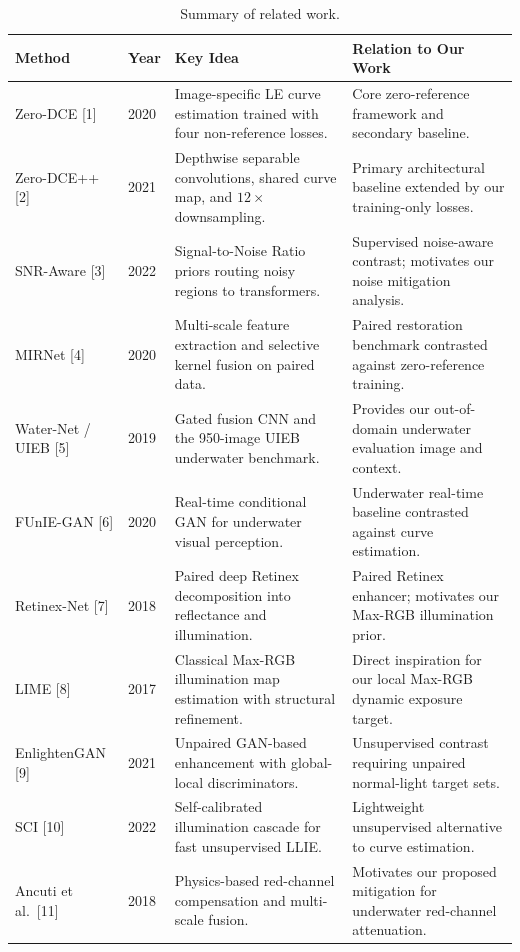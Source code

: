 \documentclass[11pt, letterpaper]{article}
\begin{document}
\begin{table}[h]
\centering
\small
\begin{tabular}{p{2.4cm}p{0.9cm}p{4.6cm}p{5.2cm}}
\toprule
\textbf{Method} & \textbf{Year} & \textbf{Key Idea} & \textbf{Relation to Our Work} \\
\midrule
Zero-DCE [1] & 2020 & Image-specific LE curve estimation trained with four non-reference losses. & Core zero-reference framework and secondary baseline. \\
Zero-DCE++ [2] & 2021 & Depthwise separable convolutions, shared curve map, and $12\times$ downsampling. & Primary architectural baseline extended by our training-only losses. \\
SNR-Aware [3] & 2022 & Signal-to-Noise Ratio priors routing noisy regions to transformers. & Supervised noise-aware contrast; motivates our noise mitigation analysis. \\
MIRNet [4] & 2020 & Multi-scale feature extraction and selective kernel fusion on paired data. & Paired restoration benchmark contrasted against zero-reference training. \\
Water-Net / UIEB [5] & 2019 & Gated fusion CNN and the 950-image UIEB underwater benchmark. & Provides our out-of-domain underwater evaluation image and context. \\
FUnIE-GAN [6] & 2020 & Real-time conditional GAN for underwater visual perception. & Underwater real-time baseline contrasted against curve estimation. \\
Retinex-Net [7] & 2018 & Paired deep Retinex decomposition into reflectance and illumination. & Paired Retinex enhancer; motivates our Max-RGB illumination prior. \\
LIME [8] & 2017 & Classical Max-RGB illumination map estimation with structural refinement. & Direct inspiration for our local Max-RGB dynamic exposure target. \\
EnlightenGAN [9] & 2021 & Unpaired GAN-based enhancement with global-local discriminators. & Unsupervised contrast requiring unpaired normal-light target sets. \\
SCI [10] & 2022 & Self-calibrated illumination cascade for fast unsupervised LLIE. & Lightweight unsupervised alternative to curve estimation. \\
Ancuti et al.\ [11] & 2018 & Physics-based red-channel compensation and multi-scale fusion. & Motivates our proposed mitigation for underwater red-channel attenuation. \\
\bottomrule
\end{tabular}
\caption{Summary of related work.}
\label{tab:related}
\end{table}
\end{document}
